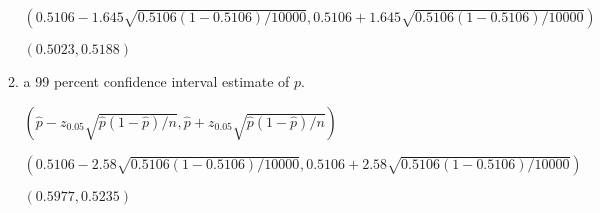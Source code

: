 \documentclass{article}
\begin{document}
\begin{enumerate}
\begin{enumerate}
        $(0.5106 - 1.645\sqrt{0.5106(1-0.5106)/10000}, 0.5106 + 1.645\sqrt{0.5106(1-0.5106)/10000})$

        $(0.5023, 0.5188)$
        \item a 99 percent confidence interval estimate of $p$.
        
        $(\hat{p} - z_{0.05}\sqrt{\hat{p}(1-\hat{p})/n}, \hat{p} + z_{0.05}\sqrt{\hat{p}(1-\hat{p})/n})$\

        $(0.5106 - 2.58\sqrt{0.5106(1-0.5106)/10000}, 0.5106 + 2.58\sqrt{0.5106(1-0.5106)/10000})$

        $(0.5977, 0.5235)$
    \end{enumerate}
\end{enumerate}
\end{document}
